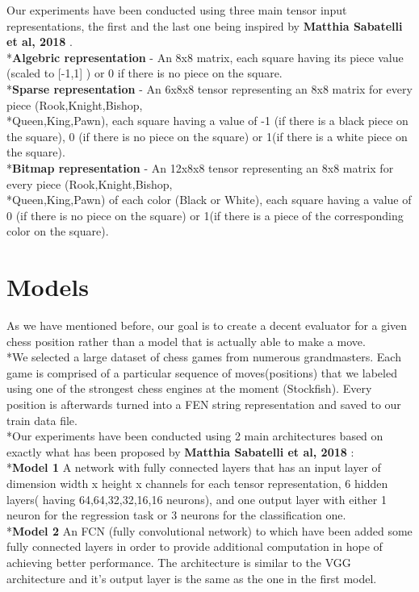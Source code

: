 \documentclass[runningheads,a4paper,11pt]{report}
\begin{document}
    Our experiments have been conducted using three main tensor input representations, the first and the last one being inspired by \textbf{Matthia Sabatelli et al, 2018} \cite{paper1}.
    \\*\textbf{Algebric representation} - An 8x8 matrix, each square having its piece value (scaled to [-1,1] ) or 0 if there is no piece on the square.
    \\*\textbf{Sparse representation} - An 6x8x8 tensor representing an 8x8 matrix for every piece (Rook,Knight,Bishop,\\*Queen,King,Pawn), each square having a value of -1 (if there is a black piece on the square), 0 (if there is no piece on the square) or 1(if there is a white piece on the square).
    \\*\textbf{Bitmap representation} - An 12x8x8 tensor representing an 8x8 matrix for every piece (Rook,Knight,Bishop,\\*Queen,King,Pawn) of each color (Black or White), each square having a value of 0 (if there is no piece on the square) or 1(if there is a piece of the corresponding color on the square).
    \section{Models}
    As we have mentioned before, our goal is to create a decent evaluator for a given chess position rather than a model that is actually able to make a move. \\*We selected a large dataset of chess games from numerous grandmasters. Each game is comprised of a particular sequence of moves(positions) that we labeled using one of the strongest chess engines at the moment (Stockfish). Every position is afterwards turned into a FEN string representation and saved to our train data file.
    \\*Our experiments have been conducted using 2 main architectures based on exactly what has been proposed by \textbf{Matthia Sabatelli et al, 2018} \cite{paper1}: 
    \\*\textbf{Model 1} A network with fully connected layers
    that has an input layer of dimension width x height x channels for each tensor representation, 6 hidden layers( having 64,64,32,32,16,16 neurons), and one output layer with either 1 neuron for the regression task or 3 neurons for the classification one.
    \\*\textbf{Model 2} An FCN (fully convolutional network) to which have been added some fully connected layers in order to provide additional computation in hope of achieving better performance. The architecture is similar to the VGG architecture and it's output layer is the same as the one in the first model. 
\end{document}
